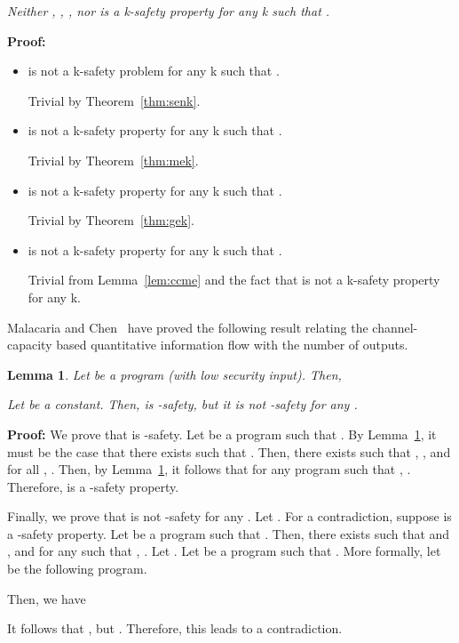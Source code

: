 \documentclass{llncs}
\newtheorem{lemma}[theorem]{Lemma}
\newenvironment{proof}{\noindent\rm{\bf Proof:}}{\hbox{}\vspace*{0.2\baselineskip}}
\newenvironment{reftheorem}[1]{\begin{trivlist}\item[\hskip
      \labelsep{\bf Theorem #1.}]\it}{\end{trivlist}}
\begin{document}
\begin{reftheorem}{\ref{thm:senk2}}
Neither , , , nor  is a
k-safety property for any k such that .
\end{reftheorem}
\begin{proof}
\noindent
\begin{itemize}
\item   is not a k-safety problem for any k such that
  .

Trivial by Theorem~\ref{thm:senk}.

\item   is not a k-safety property for any k such that
  .

Trivial by Theorem~\ref{thm:mek}.

\item  is not a k-safety property for any k such that
  .

Trivial by Theorem~\ref{thm:gek}.

\item  is not a k-safety property for any k such that .

  Trivial from Lemma~\ref{lem:ccme} and the fact that 
  is not a k-safety property for any k.

\end{itemize}
\end{proof}


Malacaria and Chen~\cite{malacaria08} have proved the following result
relating the channel-capacity based quantitative information flow with
the number of outputs.  
\begin{lemma}
\label{lem:ccloglow}
Let  be a program (with low security input).  Then,

\end{lemma}

\begin{reftheorem}{\ref{thm:cck}}
  Let  be a constant.  Then,  is
  -safety, but it is not -safety for any .
\end{reftheorem}
\begin{proof}
  We prove that  is -safety.  Let
   be a program such that .  By
  Lemma~\ref{lem:ccloglow}, it must be the case that there exists
   such that .
  Then, there exists  such that , , and for
  all , .  Then, by
  Lemma~\ref{lem:ccloglow}, it follows that for any program  such
  that , .
  Therefore,  is a -safety
  property.

  Finally, we prove that  is not -safety for any .  Let . For a
  contradiction, suppose  is a -safety property.  Let
   be a program such that .  Then, there
  exists  such that  and , and
  for any  such that , .  Let .  Let
   be a program such that .  More
  formally, let  be the following program.

Then, we have

It follows that , but
.  Therefore, this leads to a
contradiction.
\end{proof}
\end{document}
